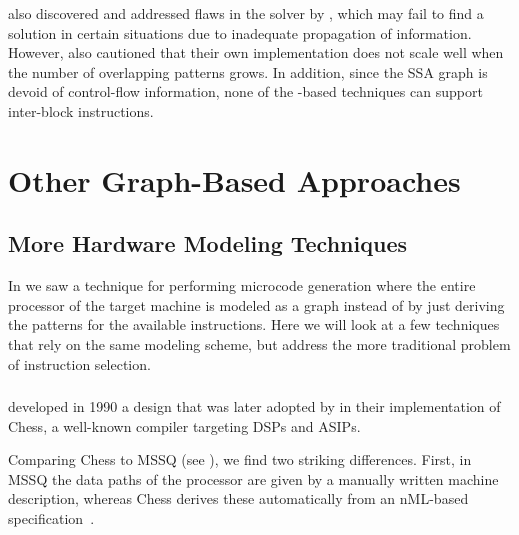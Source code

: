 \citeauthor{Buchwald2010} also discovered and addressed flaws in the
 solver by \citeauthor{Eckstein2003}, which may fail to
find a solution in certain situations due to inadequate propagation of
information.
%
However, \citeauthor{Buchwald2010} also cautioned that their own
implementation does not scale well when the number of overlapping
\glspl{pattern} grows.
%
In addition, since the \gls{SSA graph} is devoid of
control-flow information, none of the -based techniques
can support \glspl{inter-block instruction}.


\section{Other Graph-Based Approaches}

\subsection{More Hardware Modeling Techniques}

In  we saw a technique for performing \gls{microcode
  generation} where the entire processor of the \gls{target machine} is modeled
as a \gls{graph} instead of by just deriving the \glspl{pattern} for the
available \glspl{instruction}.
%
Here we will look at a few techniques that rely
on the same modeling scheme, but address the more traditional problem of
\gls{instruction selection}.


\subsubsection{}

\textcite{Lanneer1990} developed in 1990 a design that was later adopted by
 in their implementation of
\gls{Chess}, a well-known compiler targeting \glspl{DSP} and \glspl{ASIP}.

Comparing \gls{Chess} to \gls{MSSQ} (see
), we find two striking
differences.
%
First, in \gls{MSSQ} the data paths of the processor are given by a
manually written \gls{machine description}, whereas \gls{Chess} derives these
automatically from an \mbox{\gls{nML}-based} specification~\cite{Fauth1993,
  Fauth1995}.

